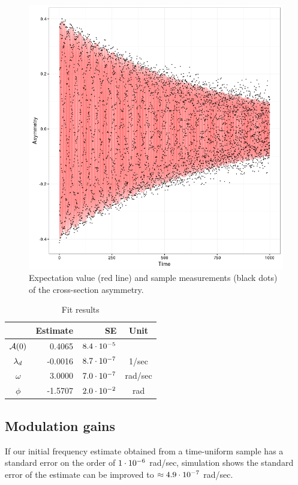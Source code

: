 \documentclass{article}
\begin{document}
\begin{figure}[h]
	\centering
	\includegraphics[scale=.85]{img/Final/Asymmetry}
	\caption{Expectation value (red line) and sample measurements (black dots) of the cross-section asymmetry.\label{fig:Asym}}
\end{figure}

\begin{table}[h]
	\centering
	\caption{Fit results\label{tbl:FitRes}}
	\begin{tabular}{crrc}
		\hline
		           & Estimate &             SE &  Unit   \\ \hline
		$\mathcal{A}(0)$ &   0.4065 & ${8.4}\cdot 10^{-5}$ &         \\
		 $\lambda_d$   &  -0.0016 & ${8.7}\cdot 10^{-7}$ &  1/sec  \\
		 $\omega$  &   3.0000 & ${7.0}\cdot 10^{-7}$ & rad/sec \\
		  $\phi$   &  -1.5707 & ${2.0}\cdot 10^{-2}$ &   rad   \\ \hline
	\end{tabular}
\end{table}

\subsection{Modulation gains}
If our initial frequency estimate obtained from a time-uniform sample has a standard error on the order of ${1}\cdot 10^{-6}$ rad/sec, simulation shows the standard error of the estimate can be improved to $\approx {4.9}\cdot 10^{-7}$ rad/sec.
\end{document}

